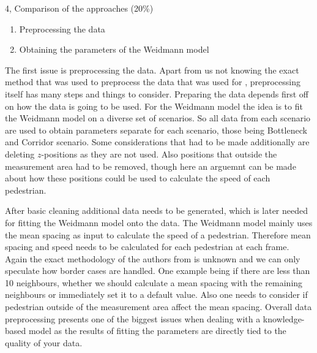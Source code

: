 \begin{task}{4, Comparison of the approaches (20\%)}
\begin{enumerate}
    \item Preprocessing the data
    \item Obtaining the parameters of the Weidmann model
\end{enumerate}

The first issue is preprocessing the data. Apart from us not knowing the exact method that was used to preprocess the data that was used for \cite{tordeux2020prediction}, preprocessing itself has many steps and things to consider. Preparing the data depends first off on how the data is going to be used. For the Weidmann model the idea is to fit the Weidmann model on a diverse set of scenarios. So all data from each scenario are used to obtain parameters separate for each scenario, those being Bottleneck and Corridor scenario. Some considerations that had to be made additionally are deleting $z$-positions as they are not used. Also positions that outside the measurement area had to be removed, though here an arguemnt can be made about how these positions could be used to calculate the speed of each pedestrian.

After basic cleaning additional data needs to be generated, which is later needed for fitting the Weidmann model onto the data. The Weidmann model mainly uses the mean spacing as input to calculate the speed of a pedestrian. Therefore mean spacing and speed needs to be calculated for each pedestrian at each frame. Again the exact methodology of the authors from \cite{tordeux2020prediction} is unknown and we can only speculate how border cases are handled. One example being if there are less than 10 neighbours, whether we should calculate a mean spacing with the remaining neighbours or immediately set it to a default value. Also one needs to consider if pedestrian outside of the measurement area affect the mean spacing. Overall data preprocessing presents one of the biggest issues when dealing with a knowledge-based model as the results of fitting the parameters are directly tied to the quality of your data.


\end{task}
